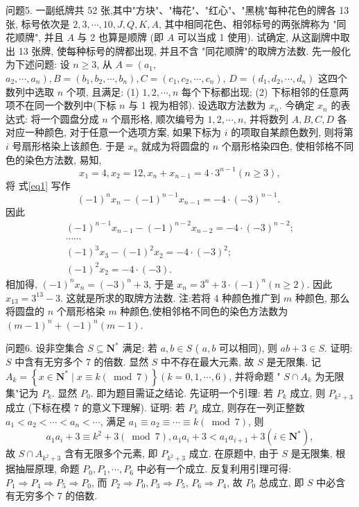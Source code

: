问题5. 一副纸牌共 52 张,其中"方块"、"梅花"、"红心"、"黑桃"每种花色的牌各 13 张, 标号依次是 $2,3, \cdots, 10, J, Q, K, A$, 其中相同花色、相邻标号的两张牌称为 "同花顺牌", 并且 $A$ 与 2 也算是顺牌 (即 $A$ 可以当成 1 使用). 试确定, 从这副牌中取出 13 张牌, 使每种标号的牌都出现, 并且不含 "同花顺牌"的取牌方法数.
先一般化为下述问题: 设 $n \geqslant 3$, 从 $A=\left(a_1\right.$, $\left.a_2, \cdots, a_n\right), B=\left(b_1, b_2, \cdots, b_n\right), C=\left(c_1, c_2, \cdots, c_n\right)$, $D=\left(d_1, d_2, \cdots, d_n\right)$ 这四个数列中选取 $n$ 个项, 且满足:
(1) $1,2, \cdots, n$ 每个下标都出现;
(2) 下标相邻的任意两项不在同一个数列中(下标 $n$ 与 1 视为相邻).
设选取方法数为 $x_n$. 今确定 $x_n$ 的表达式: 将一个圆盘分成 $n$ 个扇形格, 顺次编号为 $1,2, \cdots, n$, 并将数列 $A, B, C, D$ 各对应一种颜色, 对于任意一个选项方案, 如果下标为 $i$ 的项取自某颜色数列, 则将第 $i$ 号扇形格染上该颜色.
于是 $x_n$ 就成为将圆盘的 $n$ 个扇形格染四色, 使相邻格不同色的染色方法数, 易知,
$$
x_1=4, x_2=12, x_n+x_{n-1}=4 \cdot 3^{n-1}(n \geqslant 3), \label{eq1}
$$
将 式\ref{eq1} 写作
$$
(-1)^n x_n-(-1)^{n-1} x_{n-1}=-4 \cdot(-3)^{n-1} \text {. }
$$
因此
$$
\begin{gathered}
(-1)^{n-1} x_{n-1}-(-1)^{n-2} x_{n-2}=-4 \cdot(-3)^{n-2} ; \\
\cdots \cdots \\
(-1)^3 x_3-(-1)^2 x_2=-4 \cdot(-3)^2 ; \\
(-1)^2 x_2=-4 \cdot(-3) .
\end{gathered}
$$
相加得, $(-1)^n x_n=(-3)^n+3$, 于是 $x_n=3^n+3 \cdot(-1)^n(n \geqslant 2)$.
因此 $x_{13}=3^{13}-3$. 这就是所求的取牌方法数.
注:若将 4 种颜色推广到 $m$ 种颜色, 那么将圆盘的 $n$ 个扇形格染 $m$ 种颜色,使相邻格不同色的染色方法数为 $(m-1)^n+(-1)^n(m-1)$.



问题6. 设非空集合 $S \subseteq \mathbf{N}^*$ 满足: 若 $a, b \in S$ ( $a, b$ 可以相同), 则 $a b+3 \in S$. 证明: $S$ 中含有无穷多个 7 的倍数.
显然 $S$ 中不存在最大元素, 故 $S$ 是无限集.
记 $A_k=\left\{x \in \mathbf{N}^* \mid x \equiv k(\bmod 7)\right\}(k=0,1, \cdots, 6)$, 并将命题 " $S \cap A_k$ 为无限集"记为 $P_k$. 显然 $P_0$. 即为题目需证之结论.
先证明一个引理: 若 $P_k$ 成立, 则 $P_{k^2+3}$ 成立 (下标在模 7 的意义下理解).
证明: 若 $P_k$ 成立, 则存在一列正整数 $a_1<a_2<\cdots<a_n<\cdots$, 满足 $a_1 \equiv a_2 \equiv \cdots \equiv k(\bmod 7)$, 则
$$
a_1 a_i+3 \equiv k^2+3(\bmod 7), a_1 a_i+3<a_1 a_{i+1}+3\left(i \in \mathbf{N}^*\right),
$$
故 $S \cap A_{k^2+3}$ 含有无限多个元素, 即 $P_{k^2+3}$ 成立.
在原题中, 由于 $S$ 是无限集, 根据抽屉原理, 命题 $P_0, P_1, \cdots, P_6$ 中必有一个成立.
反复利用引理可得: $P_1 \Rightarrow P_4 \Rightarrow P_5 \Rightarrow P_0$, 而 $P_2 \Rightarrow P_0, P_3 \Rightarrow P_5$, $P_6 \Rightarrow P_4$, 故 $P_0$ 总成立, 即 $S$ 中必含有无穷多个 7 的倍数.



